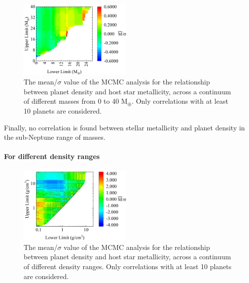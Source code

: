 \documentclass[a4paper,twocolumn,12pt]{article}
\begin{document}
\begin{figure}[h!]
    \centering
    \includegraphics[width=0.49\textwidth]{Graphs/FeH vs Density correlations - Mass ranges - Sub Neptunes.png}
    \caption{The mean/$\sigma$ value of the MCMC analysis for the relationship between planet density and host star metallicity, across a continuum of different masses from 0 to 40 M$_{\oplus}$. Only correlations with at least 10 planets are considered.}
    \label{figure: Fe/H vs Density correlations - Mass ranges (0 to 40)}
\end{figure}

Finally, no correlation is found between stellar metallicity and planet density in the sub-Neptune range of masses.






\paragraph{For different density ranges}
\begin{figure}[h!]
    \centering
    \includegraphics[width=0.49\textwidth]{Graphs/FeH vs Density correlations - Density ranges.png}
    \caption{The mean/$\sigma$ value of the MCMC analysis for the relationship between planet density and host star metallicity, across a continuum of different density ranges. Only correlations with at least 10 planets are considered.}
    \label{figure: Fe/H vs Density correlations - Density ranges (All)}
\end{figure}
\end{document}

